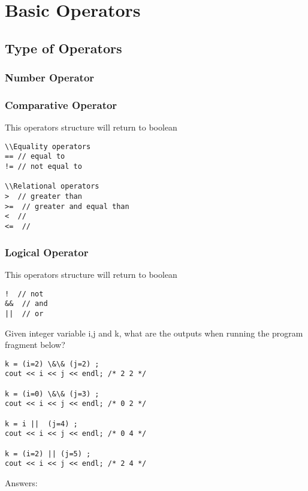 \documentclass[a4paper]{article}
\begin{document}
\section{Basic Operators}
\subsection{Type of Operators}

\subsubsection{Number Operator}


\subsubsection{Comparative Operator}
This operators structure will return to boolean
\begin{lstlisting}
\\Equality operators
== // equal to
!= // not equal to

\\Relational operators
>  // greater than
>=  // greater and equal than
<  // 
<=  //
\end{lstlisting}

\subsubsection{Logical Operator}

This operators structure will return to boolean
\begin{lstlisting}
!  // not
&&  // and
||  // or
\end{lstlisting}

\begin{eg}
Given integer variable i,j and k, what are the outputs when running the program fragment below?
\begin{lstlisting}
k = (i=2) \&\& (j=2) ;
cout << i << j << endl; /* 2 2 */

k = (i=0) \&\& (j=3) ;
cout << i << j << endl; /* 0 2 */

k = i ||  (j=4) ;
cout << i << j << endl; /* 0 4 */

k = (i=2) || (j=5) ;
cout << i << j << endl; /* 2 4 */

\end{lstlisting}
Answers:

\end{eg}
\end{document}
